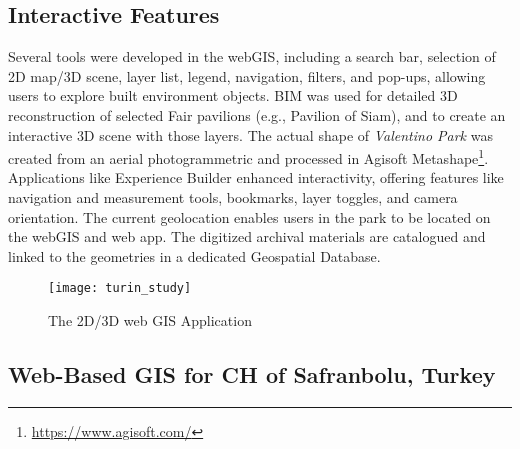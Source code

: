 \subsection*{Interactive Features}

Several tools were developed in the web\gls{GIS}, including a search bar, selection of \gls{2D} map/\gls{3D} scene, layer list, legend, navigation, filters, and pop-ups, allowing users to explore built environment objects. 
\gls{BIM} was used for detailed \gls{3D} reconstruction of selected Fair pavilions (e.g., Pavilion of Siam), and to create an interactive \gls{3D} scene with those layers. 
The actual shape of \textit{Valentino Park} was created from an aerial photogrammetric and processed in Agisoft Metashape\footnote{\url{https://www.agisoft.com/}}. Applications like Experience Builder
enhanced interactivity, offering features like navigation and measurement tools, bookmarks, layer toggles, and camera orientation. The current geolocation enables users in the park to be located on the web\gls{GIS} and web app. 
The digitized archival materials are catalogued and linked to the geometries in a dedicated Geospatial Database. 
 

\begin{figure}[h!]
  \centering
  \texttt{[image: turin\_study]}
  \caption{The \gls{2D}/\gls{3D} web \gls{GIS} Application}
  \label{fig:turin_study}
\end{figure}
\FloatBarrier




\subsection{Web-Based \gls{GIS} for \gls{CH} of Safranbolu, Turkey} 
\label{sec:gis_safranbolu}

